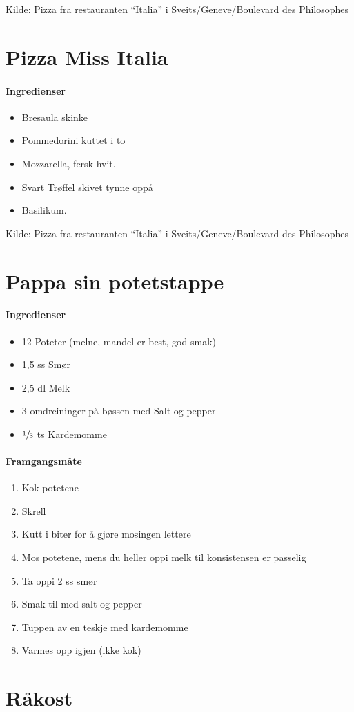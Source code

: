 \documentclass[12pt,a4paper]{book}
\begin{document}
Kilde: Pizza fra restauranten “Italia” i Sveits/Geneve/Boulevard des Philosophes
\clearpage{}
\clearpage{}\section{﻿Pizza Miss Italia}


\paragraph{Ingredienser}
\begin{itemize}[noitemsep]
	\item Bresaula skinke
	\item Pommedorini kuttet i to
	\item Mozzarella, fersk hvit.
	\item Svart Trøffel skivet tynne oppå
	\item Basilikum.
\end{itemize}




Kilde: Pizza fra restauranten “Italia” i Sveits/Geneve/Boulevard des Philosophes
\clearpage{}
\clearpage{}\section{﻿Pappa sin potetstappe}


\paragraph{Ingredienser}
\begin{itemize}[noitemsep]
	\item 12 Poteter (melne, mandel er best, god smak)
	\item 1,5 ss Smør
	\item 2,5 dl Melk
	\item 3 omdreininger på bøssen med Salt og pepper
	\item $\sfrac{1}{8}$ ts Kardemomme
\end{itemize}

\paragraph{Framgangsmåte}
\begin{enumerate}[noitemsep]
	\item Kok potetene
	\item Skrell
	\item Kutt i biter for å gjøre mosingen lettere
	\item Mos potetene, mens du heller oppi melk til konsistensen er passelig
	\item Ta oppi 2 ss smør
	\item Smak til med salt og pepper
	\item Tuppen av en teskje med kardemomme
	\item Varmes opp igjen (ikke kok)
\end{enumerate}
\clearpage{}
\clearpage{}\section{﻿Råkost}
\end{document}
